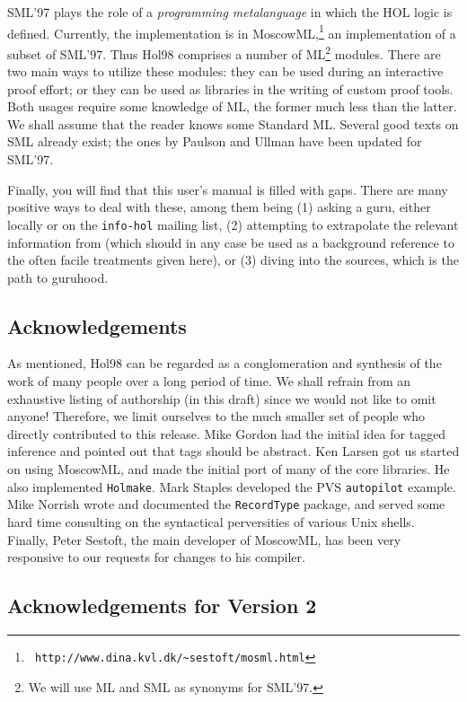 SML'97 \cite{SML97} plays the role of a {\it programming metalanguage\/}
 in which the HOL logic is defined. Currently, the implementation is in
 MoscowML,\footnote{\tt
 http://www.dina.kvl.dk/\~{}sestoft/mosml.html} 
 an implementation of a subset of SML'97.  Thus Hol98 comprises a number
 of ML\footnote{We will use ML and SML as synonyms for SML'97.}
 modules. There are two main ways to utilize these modules: they can be
 used during an interactive proof effort; or they can be used as
 libraries in the writing of custom proof tools.  Both usages require
 some knowledge of ML, the former much less than the latter. We shall
 assume that the reader knows some Standard ML. Several good texts on
 SML already exist; the ones by Paulson \cite{lcp:ml} and Ullman
 \cite{ullman:mlbook} have been updated for SML'97.

 Finally, you will find that this user's manual is filled with
 gaps. There are many positive ways to deal with these, among them being
 (1) asking a guru, either locally or on the \verb+info-hol+ mailing
 list, (2) attempting to extrapolate the relevant information from
 \cite{hol88:book} (which should in any case be used as a background
 reference to the often facile treatments given here), or (3) diving
 into the sources, which is the path to guruhood.

\subsection*{Acknowledgements}

As mentioned, Hol98 can be regarded as a conglomeration and synthesis of
the work of many people over a long period of time. We shall refrain
from an exhaustive listing of authorship (in this draft) since we would
not like to omit anyone! Therefore, we limit ourselves to the much
smaller set of people who directly contributed to this release.  Mike
Gordon had the initial idea for tagged inference and pointed out that
tags should be abstract. Ken Larsen got us started on using MoscowML,
and made the initial port of many of the core libraries. He also
implemented \verb+Holmake+. Mark Staples developed the PVS
\verb+autopilot+ example. Mike Norrish wrote and documented the
\verb+RecordType+ package, and served some hard time consulting on the
syntactical perversities of various Unix shells. Finally, Peter Sestoft,
the main developer of MoscowML, has been very responsive to our requests
for changes to his compiler.

\subsection*{Acknowledgements for Version 2}

